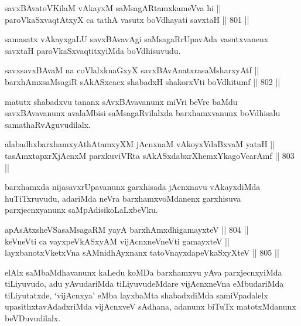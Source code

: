 
\begin{shl}
savxBAvatoV\s KilaM vAkayxM saMsagARtamxkameVva hi || \\
paroVkaSxvaqtAtxyX ca tathA vasutx boVdhayati savxtaH \hfill || 801 ||  
\end{shl}

\begin{artha}
samasatx vAkayxgaLU savxBAvavAgi saMsagaRrUpavAda vasutxvanenx savxtaH paroVkaSxvaqtitxyiMda boVdhisuvudu.
\end{artha}

\begin{shl}
savxsavxBAvaM na coVlalxknaGxyX savxBAvAnatxrasaMsharxyAtf || \\
barxhAmxsaMsagiR sAkASxcacx shabadxH shakorxVti boVdhitumf \hfill || 802 ||  
\end{shl}

\begin{artha}
matutx shabadxvu tananx sAvxBAvavanunx miVri beVre baMdu savxBAvavanunx avalaMbisi saMsagaRvilalxda barxhamxvanunx boVdhisalu samathaRvAguvudilalx.
\end{artha}

\begin{shl}
alabadhxbarxhamxyAthAtamxyXM jAcnxnaM vAkoyxVdaBxvaM yataH || \\
tasAmxtapxrXjAcnxM parxkuviVRta sAkASxdabxrXhemxYkagoVcarAmf \hfill || 803 ||  
\end{shl}

\begin{artha}
barxhamxda nijasavxrUpavanunx garxhisada jAcnxnavu vAkayxdiMda huTiTxruvudu, adariMda neVra barxhamxvoMdanenx garxhisuva parxjecnxyanunx saMpAdisikoLaLxbeVku.
\end{artha}


\begin{shl}
apAsAtxsheVSasaMsagaRM yayA barxhAmxdhigamayxteV \hfill || 804 ||  \\
keVneVti ca vayxpeVkASxyAM vijAcnxneVneVti gamayxteV || \\
layxbanotxVketxVna sAMnidhAyxnanx tatoV\s nayxdapeVkaSxyXteV \hfill || 805 ||  
\end{shl}

\begin{artha}
elAlx saMbaMdhavanunx kaLedu koMDa barxhamxvu yAva parxjecnxyiMda tiLiyuvudo, adu yAvudariMda tiLiyuvudeMdare vijAcnxneVna eMbudariMda tiLiyutatxde, `vijAcnxya' eMba layxbaMta shabadxdiMda samiVpadalelx upasithxtavAdadxriMda vijAcnxveV sAdhana, adanunx biTuTx matotxMdanunx beVDuvudilalx.
\end{artha}

